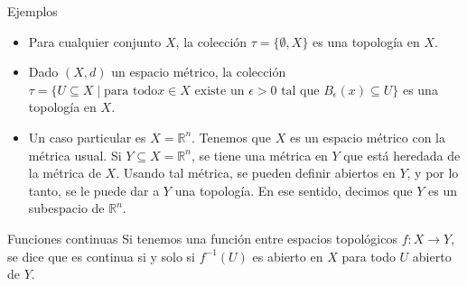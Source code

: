 \documentclass[spanish, presentation]{beamer}
\begin{document}
\begin{frame}[label={sec:orgce089f0}]{Ejemplos}
\begin{itemize}
\item Para cualquier conjunto \(X\), la colección \(\tau=\{\emptyset, X\}\) es una topología en \(X\).
\item Dado \((X,d)\) un espacio métrico, la colección
 \(\tau=\{U\subseteq X\mid\text{para todo}x\in X\text{ existe un }\epsilon>0\text{ tal que }B_{\epsilon}(x)\subseteq U\}\) 
es una topología en \(X\).
\item Un caso particular es \(X=\mathbb{R}^{n}\). Tenemos que \(X\) es un espacio métrico con la métrica usual. Si \(Y\subseteq X=\mathbb{R}^{n}\), se tiene una métrica en \(Y\) que está heredada de la métrica de \(X\). Usando tal métrica, se pueden definir abiertos en \(Y\), y por lo tanto, se le puede dar a \(Y\) una topología. En ese sentido, decimos que \(Y\) es un \alert{subespacio} de \(\mathbb{R}^{n}\).
\end{itemize}
\end{frame}

\begin{frame}[label={sec:orgb858f94}]{Funciones continuas}
Si tenemos una función entre espacios topológicos \(f\colon X\to Y\), se dice que es \alert{continua} si y solo si \(f^{-1}(U)\) es abierto en \(X\) para todo \(U\) abierto de \(Y\).
\end{frame}
\end{document}

